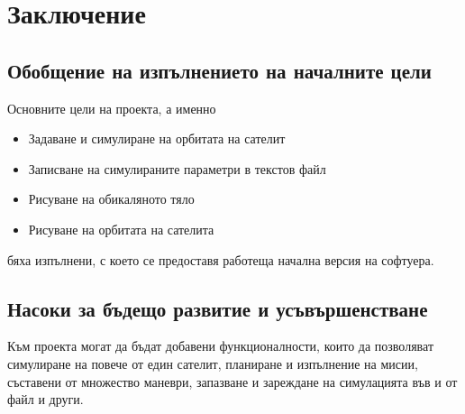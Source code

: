 \graphicspath{ {./chapter4/images/} }

\chapter{Заключение}


\section{Обобщение на изпълнението на началните цели}

Основните цели на проекта, а именно
\begin{itemize}
	\item Задаване и симулиране на орбитата на сателит
	\item Записване на симулираните параметри в текстов файл
	\item Рисуване на обикаляното тяло
	\item Рисуване на орбитата на сателита
\end{itemize}
бяха изпълнени, с което се предоставя работеща начална версия на софтуера.


\section{Насоки за бъдещо развитие и усъвършенстване}

Към проекта могат да бъдат добавени функционалности, които да позволяват
симулиране на повече от един сателит, планиране и изпълнение на мисии, съставени
от множество маневри, запазване и зареждане на симулацията във и от файл и
други.
